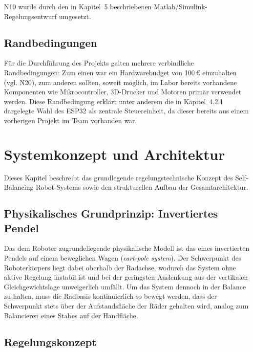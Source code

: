 \documentclass[12pt,ngerman,numbers=noenddot,abstracton,headsepline]{scrreprt}
\begin{document}
N10 wurde durch den in Kapitel~5 beschriebenen Matlab/Simulink-Regelungsentwurf umgesetzt. %

\section{Randbedingungen}
\label{sec:randbedingungen}

Für die Durchführung des Projekts galten mehrere verbindliche Randbedingungen: Zum einen war ein Hardwarebudget von 100\,€ einzuhalten (vgl. N20), zum anderen sollten, soweit möglich, im Labor bereits vorhandene Komponenten wie Mikrocontroller, 3D-Drucker und Motoren primär verwendet werden. Diese Randbedingung erklärt unter anderem die in Kapitel~4.2.1 dargelegte Wahl des ESP32 als zentrale Steuereinheit, da dieser bereits aus einem vorherigen Projekt im Team vorhanden war.

\chapter{Systemkonzept und Architektur}
\label{ch:systemkonzept}

Dieses Kapitel beschreibt das grundlegende regelungstechnische Konzept des Self-Balancing-Robot-Systems sowie den strukturellen Aufbau der Gesamtarchitektur.

\section{Physikalisches Grundprinzip: Invertiertes Pendel}
\label{sec:invertiertes_pendel}

Das dem Roboter zugrundeliegende physikalische Modell ist das eines invertierten Pendels auf einem beweglichen Wagen (\textit{cart-pole system}). Der Schwerpunkt des Roboterkörpers liegt dabei oberhalb der Radachse, wodurch das System ohne aktive Regelung instabil ist und bei der geringsten Auslenkung aus der vertikalen Gleichgewichtslage unweigerlich umfällt. Um das System dennoch in der Balance zu halten, muss die Radbasis kontinuierlich so bewegt werden, dass der Schwerpunkt stets über der Aufstandsfläche der Räder gehalten wird, analog zum Balancieren eines Stabes auf der Handfläche.

\section{Regelungskonzept}
\label{sec:regelungskonzept}
\end{document}
